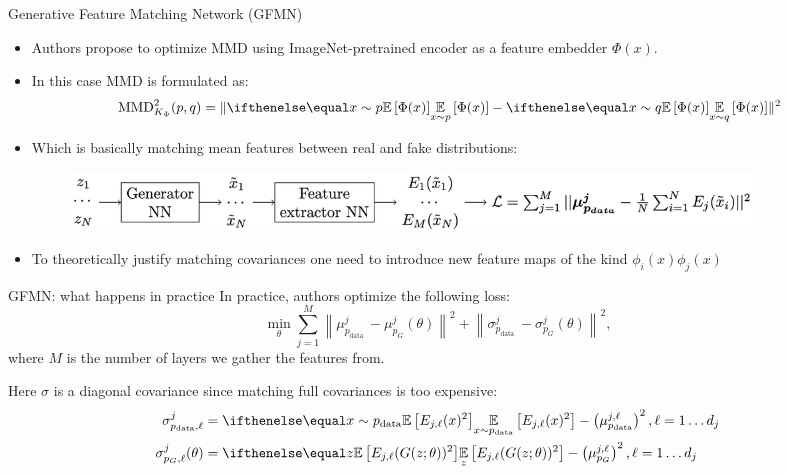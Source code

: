 \documentclass[handout, 10pt]{beamer}
\begin{document}
\begin{frame}{Generative Feature Matching Network (GFMN)}
\begin{itemize}
    \item\pause Authors propose to optimize MMD using ImageNet-pretrained encoder as a feature embedder $\Phi(x)$.
    \item\pause In this case MMD is formulated as:
\begin{equation}
\mathrm{MMD}^{2}_{K_{\Phi}}(p, q)=\|\expect[x \sim p]{\Phi(x)} - \expect[x \sim q]{\Phi(x)}\|^2
\end{equation}
    \item\pause Which is basically matching mean features between real and fake distributions:
\begin{figure}
    \centering
    \includegraphics[width=0.9\textwidth]{images/gfmn-scheme}
\end{figure}
    \item\pause To theoretically justify matching covariances one need to introduce new feature maps of the kind $\phi_i(x) \phi_j(x)$
\end{itemize}
\end{frame}


\begin{frame}{GFMN: what happens in practice}
\pause
In practice, authors optimize the following loss:
\begin{equation}
\min _{\theta} \sum_{j=1}^{M}\left\|\mu_{p_{\text {data }}}^{j}-\mu_{p_{G}}^{j}(\theta)\right\|^{2}+\left\|\sigma_{p_{\text {data }}}^{j}-\sigma_{p_{G}}^{j}(\theta)\right\|^{2},
\end{equation}
where $M$ is the number of layers we gather the features from.

\pause
Here $\sigma$ is a diagonal covariance since matching full covariances is too expensive:
\begin{equation}
\begin{aligned}
\sigma_{p_{\text {data}}, \ell}^{j} &=\expect[x \sim p_{\text{data}}]{E_{j, \ell}(x)^{2}} - \left(\mu_{p_{\text {data}}}^{j, \ell}\right)^{2}, \ell=1 \ldots d_{j} \\
\sigma_{p_{G}, \ell}^{j}(\theta) &= \expect[z]{E_{j, \ell}(G(z ; \theta))^{2}}-\left(\mu_{p_{G}}^{j, \ell}\right)^{2}, \ell=1 \ldots d_{j}
\end{aligned}
\end{equation}
\end{frame}
\end{document}
